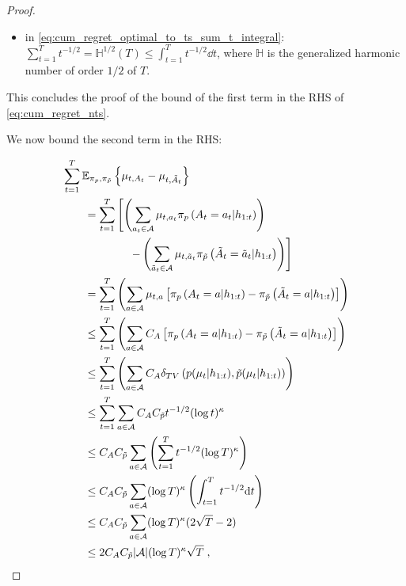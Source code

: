 \begin{proof}
\begin{itemize}
	\item in \autoref{eq:cum_regret_optimal_to_ts_sum_t_integral}: $\sum_{t=1}^{T} t^{-1/2} = \mathbb{H}^{1/2}(T)\leq \int_{t=1}^{T} t^{-1/2} \dd{t}$, where $\mathbb{H}$ is the generalized harmonic number of order $1/2$ of $T$. 
\end{itemize}

This concludes the proof of the bound of the first term in the RHS of \autoref{eq:cum_regret_nts}.

\pagebreak
We now bound the second term in the RHS:

\begin{align}
&\sum_{t=1}^T \mathbb{E}_{\pi_{p},\pi_{\tilde{p}}}\left\{ \mu_{t,A_t}-\mu_{t,\tilde{A}_t}  \right\} \\
&\qquad =\sum_{t=1}^T \left[ \left(\sum_{a_t \in \mathcal{A}}\mu_{t,a_t} \pi_{p}\left( A_t=a_t|h_{1:t} \right)\right) \right. \\
&\qquad \qquad \qquad \left. - \left( \sum_{\tilde{a}_t \in \mathcal{A}}\mu_{t,\tilde{a}_t} \pi_{\tilde{p}}\left( \tilde{A}_t=\tilde{a}_t|h_{1:t} \right)\right) \right] \\
&\qquad =\sum_{t=1}^T \left(\sum_{a \in \mathcal{A}} \mu_{t,a} \left[\pi_{p}\left( A_t=a|h_{1:t} \right)-\pi_{\tilde{p}}\left( \tilde{A}_t=a|h_{1:t} \right)\right] \right) \\
&\qquad \leq \sum_{t=1}^T \left(\sum_{a \in \mathcal{A}} C_A \left[\pi_{p}\left( A_t=a|h_{1:t} \right)-\pi_{\tilde{p}}\left( \tilde{A}_t=a|h_{1:t} \right)\right]  \right) \label{eq:cum_regret_ts_to_nts_C_A} \\
&\qquad \leq \sum_{t=1}^T \left(\sum_{a \in \mathcal{A}} C_A \delta_{TV} \left(p(\mu_t|h_{1:t}),\tilde{p}(\mu_t|h_{1:t})\right) \right) \label{eq:cum_regret_ts_to_nts_total_variation} \\
&\qquad \leq \sum_{t=1}^T \sum_{a \in \mathcal{A}} C_A C_{\tilde{p}} t^{-1/2}(\log t)^\kappa \label{eq:cum_regret_ts_to_nts_total_variation_convergence} \\
&\qquad \leq C_A C_{\tilde{p}} \sum_{a \in \mathcal{A}} \left(\sum_{t=1}^{T} t^{-1/2} (\log T)^\kappa \right) \label{eq:cum_regret_ts_to_nts_rearrange_sum_bound_logT} \\
&\qquad \leq C_A C_{\tilde{p}} \sum_{a \in \mathcal{A}} (\log T)^\kappa \left(\int_{t=1}^{T} t^{-1/2} \mathrm{d} t \right) \label{eq:cum_regret_ts_to_nts_sum_t_integral} \\
&\qquad \leq C_A C_{\tilde{p}} \sum_{a \in \mathcal{A}} (\log T)^\kappa (2 \sqrt{T} - 2) \label{eq:cum_regret_ts_to_nts_algebra_on_t_integral_solution} \\
&\qquad \leq 2 C_A C_{\tilde{p}} |\mathcal{A}| (\log T)^\kappa\sqrt{T} \; , \label{eq:cum_regret_ts_to_nts_algebra_on_t_sum_a} 
\end{align}


\end{proof}
